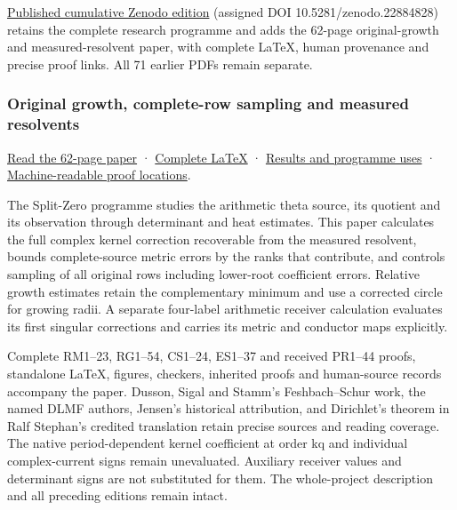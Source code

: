 \documentclass[
]{article}
\begin{document}
\href{https://zenodo.org/records/22884828}{Published cumulative Zenodo
edition} (assigned DOI 10.5281/zenodo.22884828) retains the complete
research programme and adds the 62-page original-growth and
measured-resolvent paper, with complete LaTeX, human provenance and
precise proof links. All 71 earlier PDFs remain separate.

\subsubsection{Original growth, complete-row sampling and measured
resolvents}\label{original-growth-complete-row-sampling-and-measured-resolvents}

\href{https://github.com/KokunoYumeto/zeta-function-research-reader/blob/main/workbenches/splitzero-tandem/continuations/20260922-original-growth-resolvent/ORIGINAL_GROWTH_RESOLVENT_READER.pdf}{Read
the 62-page paper} ·
\href{https://github.com/KokunoYumeto/zeta-function-research-reader/blob/main/workbenches/splitzero-tandem/continuations/20260922-original-growth-resolvent/ORIGINAL_GROWTH_RESOLVENT_READER.tex}{Complete
LaTeX} ·
\href{https://github.com/KokunoYumeto/zeta-function-research-reader/blob/main/workbenches/splitzero-tandem/continuations/20260922-original-growth-resolvent/RESULTS_20260922_020.md}{Results
and programme uses} ·
\href{https://github.com/KokunoYumeto/zeta-function-research-reader/blob/main/workbenches/splitzero-tandem/continuations/20260922-original-growth-resolvent/RESULT_INDEX.json}{Machine-readable
proof locations}.

The Split-Zero programme studies the arithmetic theta source, its
quotient and its observation through determinant and heat estimates.
This paper calculates the full complex kernel correction recoverable
from the measured resolvent, bounds complete-source metric errors by the
ranks that contribute, and controls sampling of all original rows
including lower-root coefficient errors. Relative growth estimates
retain the complementary minimum and use a corrected circle for growing
radii. A separate four-label arithmetic receiver calculation evaluates
its first singular corrections and carries its metric and conductor maps
explicitly.

Complete RM1--23, RG1--54, CS1--24, ES1--37 and received PR1--44 proofs,
standalone LaTeX, figures, checkers, inherited proofs and human-source
records accompany the paper. Dusson, Sigal and Stamm's Feshbach--Schur
work, the named DLMF authors, Jensen's historical attribution, and
Dirichlet's theorem in Ralf Stephan's credited translation retain
precise sources and reading coverage. The native period-dependent kernel
coefficient at order kq and individual complex-current signs remain
unevaluated. Auxiliary receiver values and determinant signs are not
substituted for them. The whole-project description and all preceding
editions remain intact.
\end{document}
